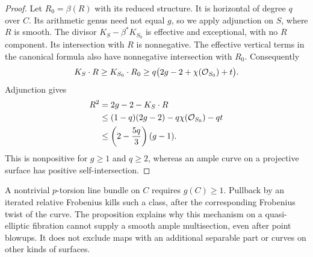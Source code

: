 \begin{proof}
Let $R_0=\beta(R)$ with its reduced structure. It is horizontal of degree
$q$ over $C$. Its arithmetic genus need not equal $g$, so we apply
adjunction on $S$, where $R$ is smooth. The divisor
$K_S-\beta^*K_{S_0}$ is effective and exceptional, with no $R$ component.
Its intersection with $R$ is nonnegative. The effective vertical terms
in the canonical formula also have nonnegative intersection with $R_0$.
Consequently
\[
 K_S\cdot R\geq K_{S_0}\cdot R_0
 \geq q\bigl(2g-2+\chi(\mathcal O_{S_0})+t\bigr).
\]
Adjunction gives
\[
 \begin{split}
 R^2
 &=2g-2-K_S\cdot R\\
 &\leq(1-q)(2g-2)-q\chi(\mathcal O_{S_0})-qt\\
 &\leq\left(2-\frac{5q}{3}\right)(g-1).
 \end{split}
\]
This is nonpositive for $g\geq1$ and $q\geq2$, whereas an ample curve
on a projective surface has positive self-intersection.
\end{proof}

A nontrivial $p$-torsion line bundle on $C$ requires $g(C)\geq1$.
Pullback by an iterated relative Frobenius kills such a class, after the
corresponding Frobenius twist of the curve. The proposition explains why
this mechanism on a quasi-elliptic fibration cannot supply a smooth ample
multisection, even after point blowups. It does not exclude maps with an
additional separable part or curves on other kinds of surfaces.

